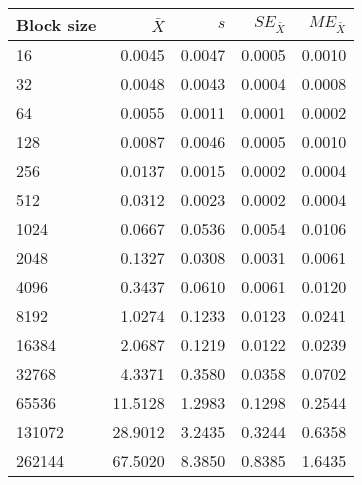 \begin{tabular}{lrrrr}\toprule
{\small Block size} & $\bar{X}$ & $s$ & $SE_{\bar{X}}$ & $ME_{\bar{X}}$ \\\midrule
16 & 0.0045 & 0.0047 & 0.0005 & 0.0010\\
32 & 0.0048 & 0.0043 & 0.0004 & 0.0008\\
64 & 0.0055 & 0.0011 & 0.0001 & 0.0002\\
128 & 0.0087 & 0.0046 & 0.0005 & 0.0010\\
256 & 0.0137 & 0.0015 & 0.0002 & 0.0004\\
512 & 0.0312 & 0.0023 & 0.0002 & 0.0004\\
1024 & 0.0667 & 0.0536 & 0.0054 & 0.0106\\
2048 & 0.1327 & 0.0308 & 0.0031 & 0.0061\\
4096 & 0.3437 & 0.0610 & 0.0061 & 0.0120\\
8192 & 1.0274 & 0.1233 & 0.0123 & 0.0241\\
16384 & 2.0687 & 0.1219 & 0.0122 & 0.0239\\
32768 & 4.3371 & 0.3580 & 0.0358 & 0.0702\\
65536 & 11.5128 & 1.2983 & 0.1298 & 0.2544\\
131072 & 28.9012 & 3.2435 & 0.3244 & 0.6358\\
262144 & 67.5020 & 8.3850 & 0.8385 & 1.6435\\
\bottomrule
\end{tabular}
